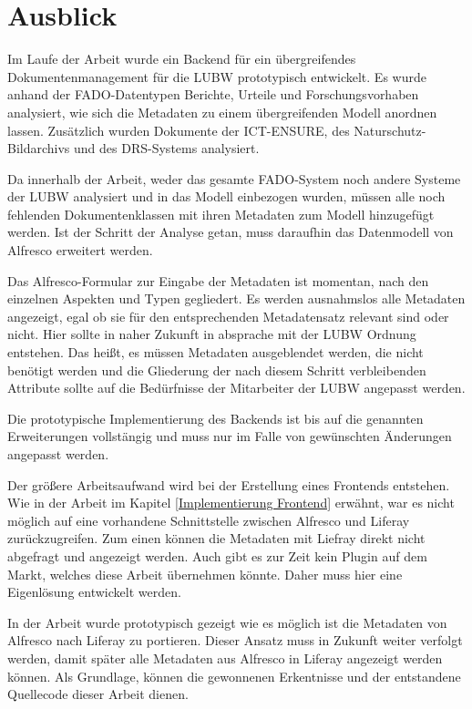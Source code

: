 \section{Ausblick}
Im Laufe der Arbeit wurde ein Backend f\"ur ein \"ubergreifendes Dokumentenmanagement f\"ur die \ac{LUBW} prototypisch entwickelt. 
Es wurde anhand der \ac{FADO}-Datentypen Berichte, Urteile und Forschungsvorhaben analysiert, wie sich die Metadaten zu einem \"ubergreifenden Modell anordnen lassen. Zus\"atzlich wurden Dokumente der \ac{ICT-ENSURE}, des Naturschutz-Bildarchivs und des \ac{DRS}-Systems analysiert.

Da innerhalb der Arbeit, weder das gesamte \ac{FADO}-System noch andere Systeme der \ac{LUBW} analysiert und in das Modell einbezogen wurden, m\"ussen alle noch fehlenden Dokumentenklassen mit ihren Metadaten zum Modell hinzugef\"ugt werden. Ist der Schritt der Analyse getan, muss daraufhin das Datenmodell von Alfresco erweitert werden.

Das Alfresco-Formular zur Eingabe der Metadaten ist momentan, nach den einzelnen Aspekten und Typen gegliedert. Es werden ausnahmslos alle Metadaten angezeigt, egal ob sie f\"ur den entsprechenden Metadatensatz relevant sind oder nicht. Hier sollte in naher Zukunft in absprache mit der \ac{LUBW} Ordnung entstehen. Das hei\ss{}t, es m\"ussen Metadaten ausgeblendet werden, die nicht ben\"otigt werden und die Gliederung der nach diesem Schritt verbleibenden Attribute sollte auf die Bed\"urfnisse der Mitarbeiter der \ac{LUBW} angepasst werden.

Die prototypische Implementierung des Backends ist bis auf die genannten Erweiterungen vollst\"angig und muss nur im Falle von gew\"unschten \"Anderungen angepasst werden.

Der gr\"o\ss{}ere Arbeitsaufwand wird bei der Erstellung eines Frontends entstehen. Wie in der Arbeit im Kapitel \ref{Implementierung Frontend} erw\"ahnt, war es nicht m\"oglich auf eine vorhandene Schnittstelle zwischen Alfresco und Liferay zur\"uckzugreifen. Zum einen k\"onnen die Metadaten mit Liefray direkt nicht abgefragt und angezeigt werden. Auch gibt es zur Zeit kein Plugin auf dem Markt, welches diese Arbeit \"ubernehmen k\"onnte. Daher muss hier eine Eigenl\"osung entwickelt werden.

In der Arbeit wurde prototypisch gezeigt wie es m\"oglich ist die Metadaten von Alfresco nach Liferay zu portieren. Dieser Ansatz muss in Zukunft weiter verfolgt werden, damit sp\"ater alle Metadaten aus Alfresco in Liferay angezeigt werden k\"onnen. Als Grundlage, k\"onnen die gewonnenen Erkentnisse und der entstandene Quellecode dieser Arbeit dienen.